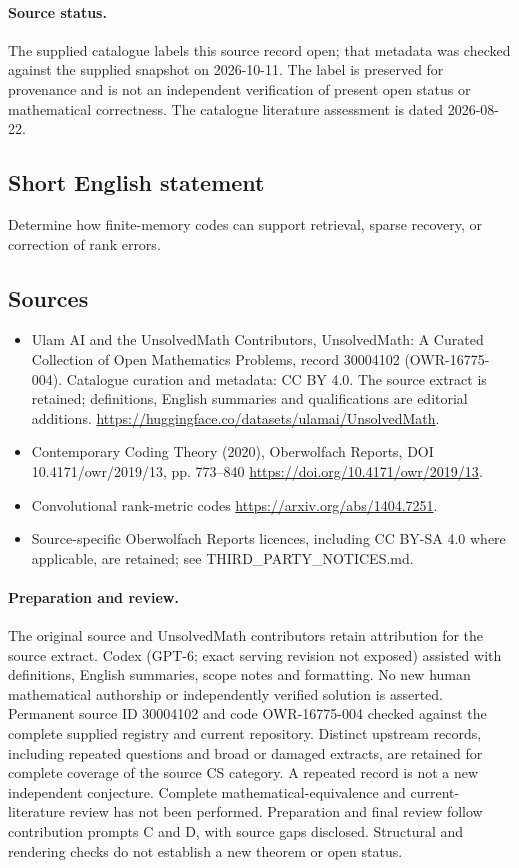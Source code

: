 \documentclass[11pt]{article}
\begin{document}
\paragraph{Source status.}
The supplied catalogue labels this source record open; that metadata was checked against the supplied snapshot on 2026-10-11. The label is preserved for provenance and is not an independent verification of present open status or mathematical correctness. The catalogue literature assessment is dated 2026-08-22.
\subsection{Short English statement}
Determine how finite-memory codes can support retrieval, sparse recovery, or correction of rank errors.
\subsection{Sources}
\begin{itemize}
\item[\hypertarget{source:30004102:1}{S1}] Ulam AI and the UnsolvedMath Contributors, UnsolvedMath: A Curated Collection of Open Mathematics Problems, record 30004102 (OWR-16775-004). Catalogue curation and metadata: CC BY 4.0. The source extract is retained; definitions, English summaries and qualifications are editorial additions.
\url{https://huggingface.co/datasets/ulamai/UnsolvedMath}.
\item[\hypertarget{source:30004102:2}{S2}] Contemporary Coding Theory (2020), Oberwolfach Reports, DOI 10.4171/owr/2019/13, pp. 773--840
\url{https://doi.org/10.4171/owr/2019/13}.
\item[\hypertarget{source:30004102:3}{S3}] Convolutional rank-metric codes
\url{https://arxiv.org/abs/1404.7251}.
\item Source-specific Oberwolfach Reports licences, including CC BY-SA 4.0 where applicable, are retained; see THIRD\_PARTY\_NOTICES.md.
\end{itemize}
\paragraph{Preparation and review.}
The original source and UnsolvedMath contributors retain attribution for the source extract. Codex (GPT-6; exact serving revision not exposed) assisted with definitions, English summaries, scope notes and formatting. No new human mathematical authorship or independently verified solution is asserted. Permanent source ID 30004102 and code OWR-16775-004 checked against the complete supplied registry and current repository. Distinct upstream records, including repeated questions and broad or damaged extracts, are retained for complete coverage of the source CS category. A repeated record is not a new independent conjecture. Complete mathematical-equivalence and current-literature review has not been performed. Preparation and final review follow contribution prompts C and D, with source gaps disclosed. Structural and rendering checks do not establish a new theorem or open status.
\label{end:30004102}
\end{document}
